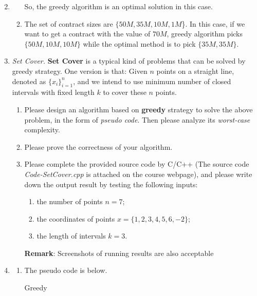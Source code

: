 \documentclass[12pt,a4paper]{article}
\makeatletter
\newtheorem*{solution}{Solution}
\theoremstyle{definition}
\renewenvironment{solution}[1][Solution] {\par\pushQED{\qed}\normalfont\topsep6\p@\@plus6\p@\relax\trivlist\item[\hskip\labelsep\bfseries#1\@addpunct{.}]\ignorespaces}{\popQED\endtrivlist\@endpefalse} \makeatother
\makeatother
\begin{document}
\begin{enumerate}
\begin{solution}
\begin{enumerate}
			      So, the greedy algorithm is an optimal solution in this case.
			\item The set of contract sizes are $\{50M,35M,10M,1M$\}. In this case, if we want to get a contract with the value of $70M$, greedy algorithm picks $\{50M,10M,10M\}$ while the optimal method is to pick $\{35M,35M\}$.
		\end{enumerate}
    \end{solution}
	
    \item \textit{Set Cover.} \textbf{Set Cover} is a typical kind of problems that can be solved by greedy strategy. One version is that: Given $n$ points on a straight line, denoted as $\{x_i\}_{i=1}^n$, and we intend to use minimum number of closed intervals with fixed length $k$ to cover these $n$ points.
    \begin{enumerate}
    	\item Please design an algorithm based on \textbf{greedy} strategy to solve the above problem, in the form of \emph{pseudo code}. Then please analyze its \emph{worst-case} complexity.
    	\item Please prove the correctness of your algorithm.
    	\item Please complete the provided source code by C/C++ {\color{blue}(The source code \emph{Code-SetCover.cpp} is attached on the course webpage)}, and please write down the output result by testing the following inputs: 
    	\begin{enumerate}
    		\item the number of points $n=7$;
    		\item the coordinates of points
    		$x=\{1,2,3,4,5,6,-2\}$;
    		\item the length of intervals
    		$k=3$.
    	\end{enumerate}
        \textbf{Remark}: Screenshots of running results are also acceptable 
    \end{enumerate}
    \begin{solution}
        \begin{enumerate}
			\item The pseudo code is below.
			\\\begin{algorithm}[H]
				
				\BlankLine
				\caption{Greedy}\label{Alg-greedy}
	

\end{algorithm}
\end{enumerate}
\end{solution}
\end{enumerate}
\end{document}
